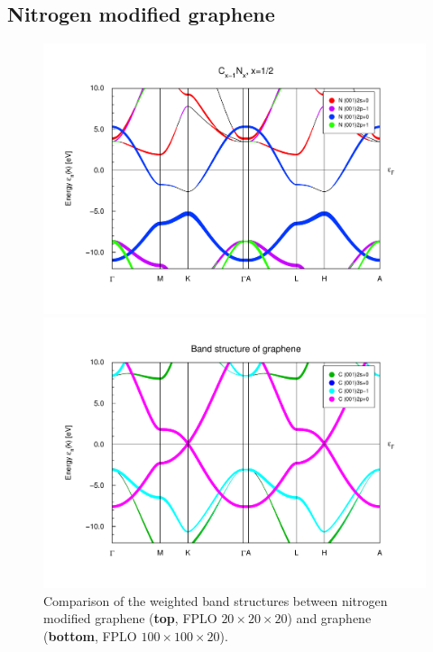 			\subsection{Nitrogen modified graphene}
				\begin{figure}
					\begin{minipage}[t]{\textwidth}
						\includegraphics[width=\textwidth]{Results/Nitrogen/Nitrogen1R/bweights.pdf}
					\end{minipage}
					\begin{minipage}[t]{\textwidth}
						\includegraphics[width=\textwidth]{Results/Graphene/GrapheneNew/bweights.pdf}
					\end{minipage}
					\caption{Comparison of the weighted band structures between nitrogen modified graphene (\textbf{top}, FPLO $20\times20\times20$) and graphene (\textbf{bottom}, FPLO $100\times100\times20$).}
					\label{fig:GrapheneNitrogenComparisson}
				\end{figure}
